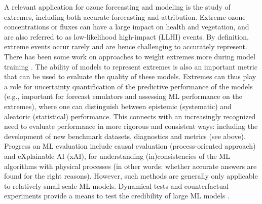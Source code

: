 \documentclass[gmd, manuscript]{copernicus}
\begin{document}
A relevant application for ozone forecasting and modeling is the study of extremes, including both accurate forecasting and attribution. Extreme ozone concentrations or fluxes can have a large impact on health and vegetation, and are also referred to as low-likelihood high-impact (LLHI) events. By definition, extreme events occur rarely and are hence challenging to accurately represent. There has been some work on approaches to weight extremes more during model training \citep{Steininger2021}. The ability of models to represent extremes is also an important metric that can be used to evaluate the quality of these models. Extremes can thus play a role for uncertainty quantification of the predictive performance of the models (e.g., important for forecast emulators and assessing ML performance on the extremes), where one can distinguish between epistemic (systematic) and aleatoric (statistical) performance. This connects with an increasingly recognized need to evaluate performance in more rigorous and consistent ways: including the development of new benchmark datasets, diagnostics and metrics (see above). Progress on ML evaluation include causal evaluation (process-oriented approach) and eXplainable AI (xAI), for understanding (in)consistencies of the ML algorithms with physical processes (in other words: whether accurate answers are found for the right reasons). However, such methods are generally only applicable to relatively small-scale ML models. Dynamical tests and counterfactual experiments provide a means to test the credibility of large ML models \citep{Hakim2024, bano-medina_are_2024}.
\end{document}
